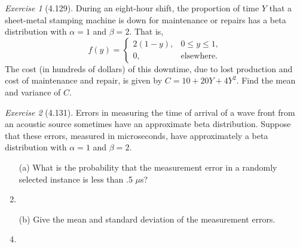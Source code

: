 \documentclass[12pt]{amsart}
\makeatletter
\theoremstyle{remark}
\newtheorem*{exercise}{Exercise}%
\renewenvironment{proof}[1][\proofname]{\par\doublespacing
  \pushQED{\qed}%
  \normalfont \topsep6\p@\@plus6\p@\relax
  \list{}{%
    \settowidth{\leftmargin}{\itshape\proofname:\hskip\labelsep}%
    \setlength{\labelwidth}{0pt}%
    \setlength{\itemindent}{-\leftmargin}%
  }%
  \item[\hskip\labelsep\itshape#1\@addpunct{:}]\ignorespaces
}{%
  \popQED\endlist\@endpefalse
  \singlespacing
}
\theoremstyle{mycomment}
\makeatother
\begin{document}
\begin{exercise}[4.129]
During an eight-hour shift, the proportion of time $Y$ that a sheet-metal stamping machine is down for maintenance or repairs has a beta distribution with $\alpha = 1$ and $\beta = 2$. That is,
$$f(y) = \begin{cases}
2(1 - y), & 0 \leq y \leq 1, \\
0, & \text{elsewhere}.
\end{cases}$$
The cost (in hundreds of dollars) of this downtime, due to lost production and cost of maintenance and repair, is given by $C = 10 + 20Y + 4Y^2$. Find the mean and variance of $C$.

\begin{proof}[Solution]
 
\end{proof}
\end{exercise}

\begin{exercise}[4.131]
Errors in measuring the time of arrival of a wave front from an acoustic source sometimes have an approximate beta distribution. Suppose that these errors, measured in microseconds, have approximately a beta distribution with $\alpha = 1$ and $\beta = 2$.

\begin{enumerate}
    \item[(a)] What is the probability that the measurement error in a randomly selected instance is less than .5 $\mu$s?
\begin{proof}[Solution]
 
\end{proof}
    \item[(b)] Give the mean and standard deviation of the measurement errors.
\begin{proof}[Solution]
 
\end{proof}
\end{enumerate}
\end{exercise}
\end{document}
